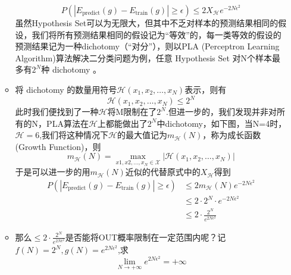 \documentclass[UTF8]{article}%
\begin{document}
\begin{enumerate}
\begin{itemize}
				$$
				P\left( | E_{\text {predict}}(g)-E_{\text {train}}(g) | \geq \epsilon\right) \leq 2 X_{\mathcal{H}} e^{-2 N \epsilon^{2}}
				$$
				虽然Hypothesis Set可以为无限大，但其中不乏对样本的预测结果相同的假设，我们将所有预测结果相同的假设记为“等效”的，每一类等效的假设的预测结果记为一种dichotomy（“对分”），则以PLA (Perceptron Learning Algorithm)算法解决二分类问题为例，任意 Hypothesis Set 对N个样本最多有$2^N$种 dichotomy 。
				\item  将 dichotomy 的数量用符号$\mathcal{H}\left(x_{1}, x_{2}, \ldots, x_{N}\right)$表示，则有
				$$
				\mathcal{H}\left(x_{1}, x_{2}, \ldots, x_{N}\right) \leq 2^{N}
				$$
				此时我们便找到了一种${\mathcal{H}}$将M限制在了$2^N$.但进一步的，我们发现并非对所有的N，PLA算法在$\mathcal{H}$上都能做出了$2^N$中dichotomy，如下图，当N=4时，${\mathcal{H}}=6$,我们将这种情况下${\mathcal{H}}$的最大值记为$m_{\mathcal{H}}(N)$，称为成长函数(Growth Function)，则
				$$
				m_{\mathcal{H}}(N)=\max _{x 1, x 2, \ldots, x_{N} \in \mathcal{X}}\left|\mathcal{H}\left(x_{1}, x_{2}, \ldots, x_{N}\right)\right|
				$$
				于是可以进一步的用$m_{\mathcal{H}}(N)$\color{red}近似的\color{black}代替原式中的$X_{\mathcal{H}}$得到
				\begin{equation}
					\begin{aligned} 
					P\left( | E_{\text {predict}}(g)-E_{\text {train}}(g) | \geq \epsilon\right)&\leq 2 m_{\mathcal{H}}(N) e^{-2 N \epsilon^{2}}\\ 
					&\leq 2 \cdot 2^{N} \cdot e^{-2 N \epsilon^{2}}\\
					&\leq 2 \cdot \frac{2^{N}}{e^{2 N \epsilon^{2}}}
					\end{aligned} 
				\end{equation}
				\item 那么$\leq 2 \cdot \frac{2^{N}}{e^{2 N \epsilon^{2}}}$是否能将OUT概率限制在一定范围内呢？记$f(N)=2^N,g(N)=e^{2 N \epsilon^{2}}$,求
				$$
				\lim _{N \rightarrow+\infty} e^{2 N \epsilon^{2}}=+\infty
				$$
\end{itemize}
\end{enumerate}
\end{document}
